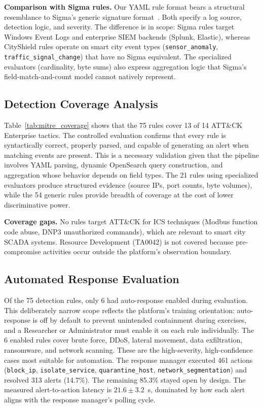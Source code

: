 \documentclass[conference,10pt]{IEEEtran}
\begin{document}
\textbf{Comparison with Sigma rules.} Our YAML rule format bears a structural resemblance to Sigma's generic signature format~\cite{sigma2020}. Both specify a log source, detection logic, and severity. The difference is in scope: Sigma rules target Windows Event Logs and enterprise SIEM backends (Splunk, Elastic), whereas CityShield rules operate on smart city event types (\texttt{sensor\_anomaly}, \texttt{traffic\_signal\_change}) that have no Sigma equivalent. The specialized evaluators (cardinality, byte sums) also express aggregation logic that Sigma's field-match-and-count model cannot natively represent.

\subsection{Detection Coverage Analysis}

Table~\ref{tab:mitre_coverage} shows that the 75 rules cover 13 of 14 ATT\&CK Enterprise tactics. The controlled evaluation confirms that every rule is syntactically correct, properly parsed, and capable of generating an alert when matching events are present. This is a necessary validation given that the pipeline involves YAML parsing, dynamic OpenSearch query construction, and aggregation whose behavior depends on field types. The 21 rules using specialized evaluators produce structured evidence (source IPs, port counts, byte volumes), while the 54 generic rules provide breadth of coverage at the cost of lower discriminative power.

\textbf{Coverage gaps.} No rules target ATT\&CK for ICS techniques (Modbus function code abuse, DNP3 unauthorized commands), which are relevant to smart city SCADA systems. Resource Development (TA0042) is not covered because pre-compromise activities occur outside the platform's observation boundary.

\subsection{Automated Response Evaluation}

Of the 75 detection rules, only 6 had auto-response enabled during evaluation. This deliberately narrow scope reflects the platform's training orientation: auto-response is off by default to prevent unintended containment during exercises, and a Researcher or Administrator must enable it on each rule individually. The 6 enabled rules cover brute force, DDoS, lateral movement, data exfiltration, ransomware, and network scanning. These are the high-severity, high-confidence cases most suitable for automation. The response manager executed 461 actions (\texttt{block\_ip}, \texttt{isolate\_service}, \texttt{quarantine\_host}, \texttt{network\_segmentation}) and resolved 313 alerts (14.7\%). The remaining 85.3\% stayed open by design. The measured alert-to-action latency is $21.6 \pm 3.2$~s, dominated by how each alert aligns with the response manager's polling cycle.
\end{document}
